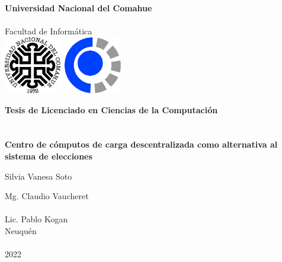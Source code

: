 
\titlepage

\begin{center}
\ \\
\ \\
\vspace{-1cm}
 

\ \\

\vspace{0.5cm}
{\Large{\bf \sc Universidad Nacional del Comahue}}\\

\ \\
{\Large { \sc Facultad de Informática}}\\

\vspace{-2.5cm}
\mbox{\hspace{-1cm}\includegraphics[width=2.5cm,height=2.5cm]{img/unc.png}\hspace{13cm} \includegraphics[width=2.5cm,height=2.5cm]{img/fai.png}}


\vspace{6cm}

{\Large {\bf\sc Tesis de Licenciado en Ciencias de la Computaci\'on}}\\
\ \\
\ \\
{\LARGE {\bf Centro de cómputos de carga descentralizada como alternativa al sistema de elecciones}}\\
\vspace{3cm}


{\Large Silvia Vanesa Soto}\\
\vspace{2cm}

{\Large Mg. Claudio Vaucheret}\\
\ \\
{\Large Lic. Pablo Kogan}\\

\vfill
{\Large {\sc Neuqu\'en}\hspace{6cm}{\sc Argentina}}\\
\ \\

{\Large 2022}\\

\end{center}

\pagebreak

